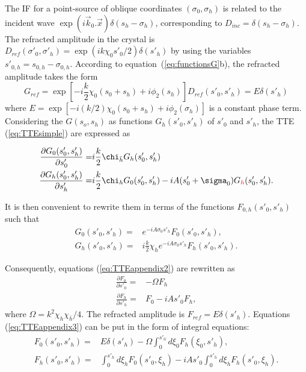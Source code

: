 \documentclass[preprint]{iucr}              %
\newcommand{\inred}[1]{{\color{red}#1}}
\begin{document}
The IF for a point-source of oblique coordinates $(\sigma_0,\sigma_h)$ is related to the incident wave $\exp(i\vec k_0 . \vec x) \delta(s_h-\sigma_h)$, corresponding to $D_{inc}=\delta(s_h-\sigma_h)$. The refracted amplitude in the crystal is $D_{ref}(\sigma'_0,\sigma'_h)=\exp(i k \chi_0 s'_0/2)\delta(s'_h)$ by using the variables $s'_{0,h}=s_{0,h}-\sigma_{0,h}$.
According to equation~(\ref{eq:functionsG}b), the refracted amplitude takes the form
\begin{equation}
    G_{ref}=\exp[-i\frac{k}{2}\chi_0(s_0+s_h)+i \phi_2(s_h)] D_{ref}(s'_0,s'_h) = E\delta(s'_h)
\end{equation}
where $E=\exp[-i (k/2) \chi_0 (s_0 + s_h) + i \phi_2(\sigma_h)]$ is a constant phase term. Considering the $G(s_o,s_h)$  as functions $G_h(s'_0,s'_h)$ of $s'_0$ and $s'_h$, the TTE (\ref{eq:TTEsimple}) are expressed as

\begin{subequations}
\label{eq:TTEappendix}
\begin{align}
    \frac{\partial G_0(s'_0,s'_h)}{\partial s'_0}=&i\frac{k}{2}\chi_{\bar h} G_h(s'_0,s'_h) \\
    \frac{\partial G_h(s'_0,s'_h)}{\partial s'_h}=&i\frac{k}{2}\chi_{h} G_0(s'_0,s'_h) -i A (s'_0+\sigma_0)G\inred{_h}(s'_0,s'_h).
\end{align}
\end{subequations}

It is then convenient to rewrite them in terms of the functions $F_{0,h}(s'_0,s'_h)$ such that
\begin{subequations}
\label{eq:TTEappendix2}
\begin{align}
    G_0(s'_0,s'_h) =& e^{-iA\sigma_0s'_h} F_0(s'_0,s'_h),\\
    G_h(s'_0,s'_h)=&i\frac{k}{2}\chi_{h} e^{-iA\sigma_0s'_h} F_h(s'_0,s'_h).
\end{align}
\end{subequations}

Consequently, equations (\ref{eq:TTEappendix2}) are rewritten as
\begin{subequations}
\label{eq:TTEappendix3}
\begin{align}
    \frac{\partial F_0}{\partial s'_0}=&-\Omega F_h \\
    \frac{\partial F_h}{\partial s'_h}=&F_0-i A s'_0 F_h,
\end{align}
\end{subequations}
where $\Omega=k^2\chi_h\chi_{\bar h}/4$. The refracted amplitude is $F_{ref}=E\delta(s'_h)$. Equations (\ref{eq:TTEappendix3}) can be put in the form of integral equations:
\begin{subequations}
\label{eq:TTEappendixIntegral}
\begin{align}
    F_0(s'_0,s'_h) =& E \delta(s'_h) -\Omega\int_0^{s'_0} d\xi_0F_h(\xi_0,s'_h),\\
    F_h(s'_0,s'_h)=& \int_0^{s'_h} d\xi_h F_0(s'_0,\xi_h) - i A s'_0 \int_0^{s'_h} d\xi_h F_h(s'_0,\xi_h).
\end{align}
\end{subequations}
\end{document}
